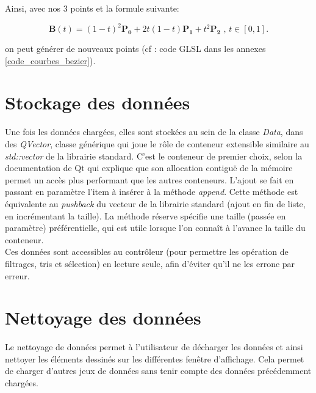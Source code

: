 \documentclass[12pt]{article}
\begin{document}
		Ainsi, avec nos 3 points et la formule suivante:
		
		\[
			{\mathbf  {B}}(t)=(1-t)^{{2}}{\mathbf  {P_{0}}}+2t(1-t){\mathbf  {P_{1}}}+t^{{2}}{\mathbf  {P_{2}}}{\mbox{ , }}t\in [0,1].
		\]
		
		on peut générer de nouveaux points (cf : code GLSL dans les annexes \ref{code_courbes_bezier}).
	
	\newpage
	\section{Stockage des données}
	Une fois les données chargées, elles sont stockées au sein de la classe \textit{Data}, dans des \textit{QVector}, classe générique qui joue le rôle de conteneur extensible similaire au \textit{std::vector} de la librairie standard. C'est le conteneur de premier choix, selon la documentation de Qt qui explique que son allocation contiguë de la mémoire permet un accès plus performant que les autres conteneurs.
	L’ajout se fait en passant en paramètre l’item à insérer à la méthode \textit{append}. Cette méthode est équivalente au \textit{pushback} du vecteur de la librairie standard (ajout en fin de liste, en incrémentant la taille). La méthode réserve spécifie une taille (passée en paramètre) préférentielle, qui est utile lorsque l’on connaît à l’avance la taille du conteneur.\\

	Ces données sont accessibles au contrôleur (pour permettre les opération de filtrages, tris et sélection) en lecture seule, afin d’éviter qu’il ne les errone par erreur.\\

\newpage
	\section{Nettoyage des données}
	Le nettoyage de données permet à l'utilisateur de décharger les données et ainsi nettoyer
	les éléments dessinés sur les différentes fenêtre d'affichage. Cela permet de charger 
	d'autres jeux de données sans tenir compte des données précédemment chargées.\\
	
\end{document}
